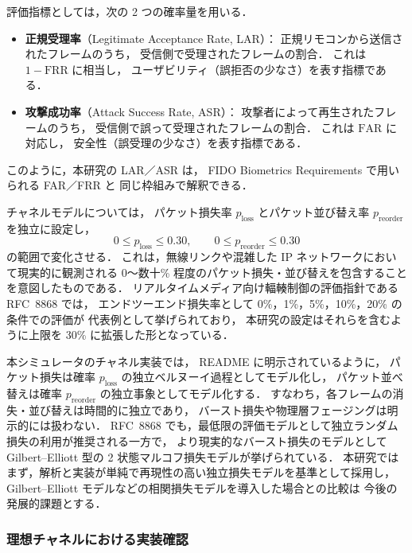 \documentclass[twocolumn,10pt,a4paper]{jsarticle}
\begin{document}
評価指標としては，次の 2 つの確率量を用いる．
\begin{itemize}
  \item \textbf{正規受理率}（Legitimate Acceptance Rate, LAR）：
        正規リモコンから送信されたフレームのうち，
        受信側で受理されたフレームの割合．
        これは $1 - \mathrm{FRR}$ に相当し，
        ユーザビリティ（誤拒否の少なさ）を表す指標である．
  \item \textbf{攻撃成功率}（Attack Success Rate, ASR）：
        攻撃者によって再生されたフレームのうち，
        受信側で誤って受理されたフレームの割合．
        これは $\mathrm{FAR}$ に対応し，
        安全性（誤受理の少なさ）を表す指標である．
\end{itemize}
このように，本研究の LAR／ASR は，
FIDO Biometrics Requirements で用いられる FAR／FRR と
同じ枠組みで解釈できる\cite{FIDO-Bio}．

チャネルモデルについては，
パケット損失率 $p_{\mathrm{loss}}$ とパケット並び替え率 $p_{\mathrm{reorder}}$ を独立に設定し，
\[
  0 \leq p_{\mathrm{loss}} \leq 0.30,\qquad
  0 \leq p_{\mathrm{reorder}} \leq 0.30
\]
の範囲で変化させる．
これは，無線リンクや混雑した IP ネットワークにおいて現実的に観測される
0～数十\% 程度のパケット損失・並び替えを包含することを意図したものである．
リアルタイムメディア向け輻輳制御の評価指針である RFC~8868 では，
エンドツーエンド損失率として 0\%，1\%，5\%，10\%，20\% の条件での評価が
代表例として挙げられており\cite{RFC8868}，
本研究の設定はそれらを含むように上限を 30\% に拡張した形となっている．

本シミュレータのチャネル実装では，
README に明示されているように\cite{ReplaySimReadmeJP}，
パケット損失は確率 $p_{\mathrm{loss}}$ の独立ベルヌーイ過程としてモデル化し，
パケット並べ替えは確率 $p_{\mathrm{reorder}}$ の独立事象としてモデル化する．
すなわち，各フレームの消失・並び替えは時間的に独立であり，
バースト損失や物理層フェージングは明示的には扱わない．
RFC~8868 でも，最低限の評価モデルとして独立ランダム損失の利用が推奨される一方で\cite{RFC8868}，
より現実的なバースト損失のモデルとして
Gilbert--Elliott 型の 2 状態マルコフ損失モデルが挙げられている\cite{Hasslinger2008GE}．
本研究ではまず，解析と実装が単純で再現性の高い独立損失モデルを基準として採用し，
Gilbert--Elliott モデルなどの相関損失モデルを導入した場合との比較は
今後の発展的課題とする．

\subsubsection{理想チャネルにおける実装確認}
\label{subsec:ideal-verify}
\end{document}
